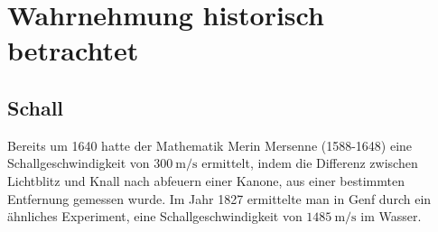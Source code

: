\section{Wahrnehmung historisch betrachtet}
\subsection{Schall}
Bereits um 1640 hatte der Mathematik Merin Mersenne (1588-1648) eine Schallgeschwindigkeit von $\si{300~\metre\per\second}$ ermittelt, indem die Differenz zwischen Lichtblitz und Knall nach abfeuern einer Kanone, aus einer bestimmten Entfernung gemessen wurde. Im Jahr 1827 ermittelte man in Genf durch ein ähnliches Experiment, eine Schallgeschwindigkeit von $\si{1485~\metre\per\second}$ im Wasser.